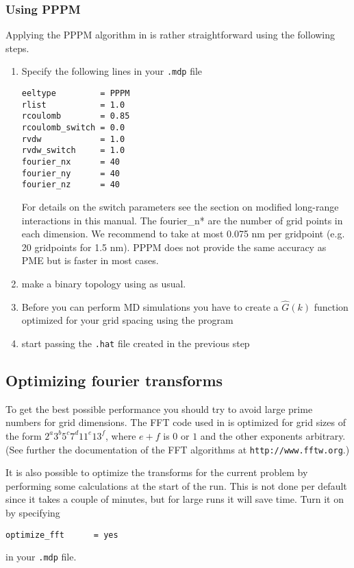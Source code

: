 \subsubsection{Using PPPM}
Applying the PPPM algorithm in {\gromacs} is rather straightforward using the
following steps.
\begin{enumerate}
\item   Specify the following lines in your {\tt .mdp} file
\begin{verbatim}
eeltype         = PPPM
rlist           = 1.0
rcoulomb        = 0.85
rcoulomb_switch = 0.0
rvdw            = 1.0
rvdw_switch     = 1.0
fourier_nx      = 40
fourier_ny      = 40
fourier_nz      = 40
\end{verbatim}
For details on the switch parameters see the section on modified
long-range interactions in this manual. The fourier\_n* are the number
of grid points in each 
dimension.
We recommend to take at most 0.075 nm per gridpoint (e.g. 20 gridpoints for 1.5 nm).
PPPM does not provide the same accuracy as PME but is faster in most
cases.

\item   make a binary topology using {\tt{}} as usual. 
\item   Before you can perform MD simulations you have to create a 
        $\hat{G}(k)$ function optimized for your grid spacing using the
        {\tt{}} program
\item   start {\tt{}} passing the {\tt .hat} file created in the
        previous step
\end{enumerate}

\subsection{Optimizing fourier transforms}
To get the best possible performance you should try to avoid large
prime numbers for grid dimensions.
The FFT code used in {\gromacs} is
optimized for grid sizes of the form $2^a 3^b 5^c 7^d 11^e 13^f$,
where $e+f$ is $0$ or $1$ and the other exponents arbitrary. (See
further the documentation of the FFT algorithms at {\tt http://www.fftw.org}.)

It is also possible to optimize the transforms for the current problem
by performing some calculations at the start of the run. This is not
done per default since it takes a couple of minutes, but for large
runs it will save time. Turn it on by specifying

\begin{verbatim}
optimize_fft      = yes
\end{verbatim}
in your {\tt .mdp} file.

